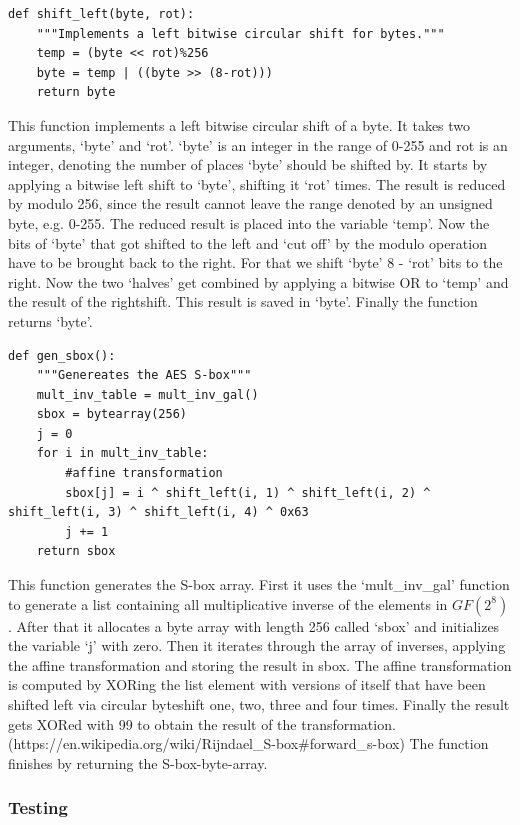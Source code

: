 \begin{lstlisting}
def shift_left(byte, rot):
    """Implements a left bitwise circular shift for bytes."""
    temp = (byte << rot)%256
    byte = temp | ((byte >> (8-rot)))
    return byte
\end{lstlisting}

This function implements a left bitwise circular shift of a byte. It
takes two arguments, `byte' and `rot'. `byte' is an integer in the range
of 0-255 and rot is an integer, denoting the number of places `byte'
should be shifted by. It starts by applying a bitwise left shift to
`byte', shifting it `rot' times. The result is reduced by modulo 256,
since the result cannot leave the range denoted by an unsigned byte,
e.g. 0-255. The reduced result is placed into the variable `temp'. Now
the bits of `byte' that got shifted to the left and `cut off' by the
modulo operation have to be brought back to the right. For that we shift
`byte' 8 - `rot' bits to the right. Now the two `halves' get combined by
applying a bitwise OR to `temp' and the result of the rightshift. This
result is saved in `byte'. Finally the function returns `byte'.

\begin{lstlisting}
def gen_sbox():
    """Genereates the AES S-box"""
    mult_inv_table = mult_inv_gal()
    sbox = bytearray(256)
    j = 0
    for i in mult_inv_table:
        #affine transformation
        sbox[j] = i ^ shift_left(i, 1) ^ shift_left(i, 2) ^ shift_left(i, 3) ^ shift_left(i, 4) ^ 0x63
        j += 1
    return sbox
\end{lstlisting}

This function generates the S-box array. First it uses the
`mult\_inv\_gal' function to generate a list containing all
multiplicative inverse of the elements in $GF(2^{8})$. After that it
allocates a byte array with length 256 called `sbox' and initializes the
variable `j' with zero. Then it iterates through the array of inverses,
applying the affine transformation and storing the result in sbox. The
affine transformation is computed by XORing the list element with
versions of itself that have been shifted left via circular byteshift
one, two, three and four times. Finally the result gets XORed with 99 to
obtain the result of the transformation.
(https://en.wikipedia.org/wiki/Rijndael\_S-box\#forward\_s-box) The
function finishes by returning the S-box-byte-array.

\hypertarget{testing-1}{%
\subsubsection{Testing}\label{testing-1}}

